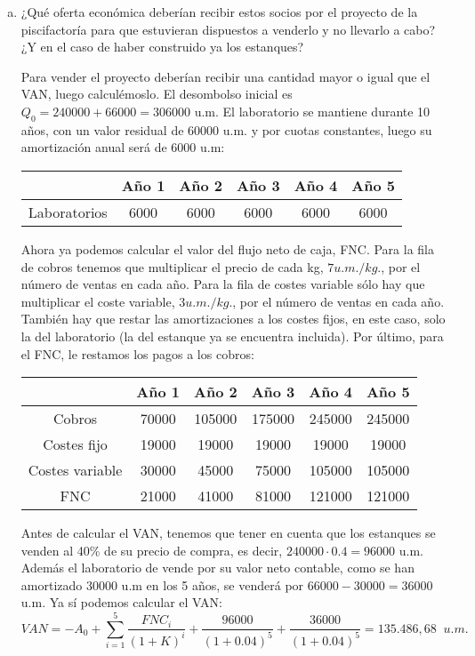 \documentclass[11pt]{article}
\theoremstyle{definition}
\theoremstyle{remark}
\begin{document}
\begin{enumerate}[(a)]
\item ¿Qué oferta económica deberían recibir estos socios por el proyecto de la piscifactoría para que estuvieran dispuestos a venderlo y no llevarlo a cabo? ¿Y en el caso de haber construido ya los estanques?

Para vender el proyecto deberían recibir una cantidad mayor o igual que el VAN, luego calculémoslo. El desombolso inicial es $Q_0=240000+66000=306000$ u.m. El laboratorio se mantiene durante 10 años, con un valor residual de 60000 u.m. y por cuotas constantes, luego su amortización anual será de 6000 u.m:

\begin{center}
\begin{tabular}{|c|c|c|c|c|c|}
 \hline 
   & Año 1 & Año 2 & Año 3 & Año 4 & Año 5 \\ 
 \hline 
 Laboratorios & 6000 & 6000 & 6000 & 6000 & 6000 \\ 
 \hline 
 \end{tabular}  
\end{center}

Ahora ya podemos calcular el valor del flujo neto de caja, FNC. Para la fila de cobros tenemos que multiplicar el precio de cada kg, $7u.m./kg.$, por el número de ventas en cada año. Para la fila de costes variable sólo hay que multiplicar el coste variable, $3u.m./kg.$, por el número de ventas en cada año. También hay que restar las amortizaciones a los costes fijos, en este caso, solo la del laboratorio (la del estanque ya se encuentra incluida). Por último, para el FNC, le restamos los pagos a los cobros:
\begin{center}
\begin{tabular}{|c|c|c|c|c|c|}
\hline 
 & Año 1 & Año 2 & Año 3 & Año 4 & Año 5 \\ 
\hline 
Cobros & 70000 & 105000 & 175000 & 245000 & 245000 \\ 
\hline 
Costes fijo & 19000 & 19000 & 19000 & 19000 & 19000 \\ 
\hline 
Costes variable & 30000 & 45000 & 75000 & 105000 & 105000 \\ 
\hline 
FNC & 21000 & 41000 & 81000 & 121000 & 121000 \\ 
\hline 
\end{tabular} 
\end{center}

Antes de calcular el VAN, tenemos que tener en cuenta que los estanques se venden al 40\% de su precio de compra, es decir, $240000\cdot 0.4=96000$ u.m. Además el laboratorio de vende por su valor neto contable, como se han amortizado 30000 u.m en los 5 años, se venderá por $66000-30000=36000$ u.m. Ya sí podemos calcular el VAN:
\[
VAN=-A_0+\sum_{i=1}^5\frac{FNC_i}{(1+K)^i}+\frac{96000}{(1+0.04)^5}+\frac{36000}{(1+0.04)^5}=135.486,68 \;\; u.m.
\]


\end{enumerate}
\end{document}
